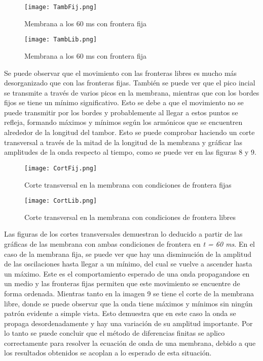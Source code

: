 \documentclass[11pt,letterpaper]{exam}
\begin{document}
\begin{figure}[h!]
	\centering
	\texttt{[image: TambFij.png]}
	\caption{Membrana a los 60 ms con frontera fija}
\end{figure}


\begin{figure}[h!]
	\centering
	\texttt{[image: TambLib.png]}
	\caption{Membrana a los 60 ms con frontera fija}
\end{figure}

Se puede observar que el movimiento con las fronteras libres es mucho más desorganizado que con las fronteras fijas. También se puede ver que el pico incial se transmite a través de varios picos en la membrana, mientras que con los bordes fijos se tiene un mínimo significativo. Esto se debe a que el movimiento no se puede transmitir por los bordes y probablemente al llegar a estos puntos se refleja, formando máximos y mínimos según los armónicos que se encuentren alrededor de la longitud del tambor. Esto se puede comprobar haciendo un corte transversal a través de la mitad de la longitud de la membrana y gráficar las amplitudes de la onda respecto al tiempo, como se puede ver en las figuras 8 y 9.\\

\begin{figure}[h!]
	\centering
	\texttt{[image: CortFij.png]}
	\caption{Corte transversal en la membrana con condiciones de frontera fijas}
\end{figure}


\begin{figure}[h!]
	\centering
	\texttt{[image: CortLib.png]}
	\caption{Corte transversal en la membrana con condiciones de frontera libres}
\end{figure}
Las figuras de los cortes transversales demuestran lo deducido a partir de las gráficas de las membrana con ambas condiciones de frontera en \textit{t = 60 ms}. En el caso de la membrana fija, se puede ver que hay una disminución de la amplitud de las oscilaciones hasta llegar a un mínimo, del cual se vuelve a ascender hasta un máximo. Este es el comportamiento esperado de una onda propagandose en un medio y las fronteras fijas permiten que este movimiento se encuentre de forma ordenada. Mientras tanto en la imagen 9 se tiene el corte de la membrana libre, donde se puede observar que la onda tiene máximos y mínimos sin ningún patrón evidente a simple vista. Esto demuestra que en este caso la onda se propaga desordenadamente y hay una variación de su amplitud importante. Por lo tanto se puede concluir que el método de diferencias finitas se aplico correctamente para resolver la ecuación de onda de una membrana, debido a que los resultados obtenidos se acoplan a lo esperado de esta situación. 
\end{document}
